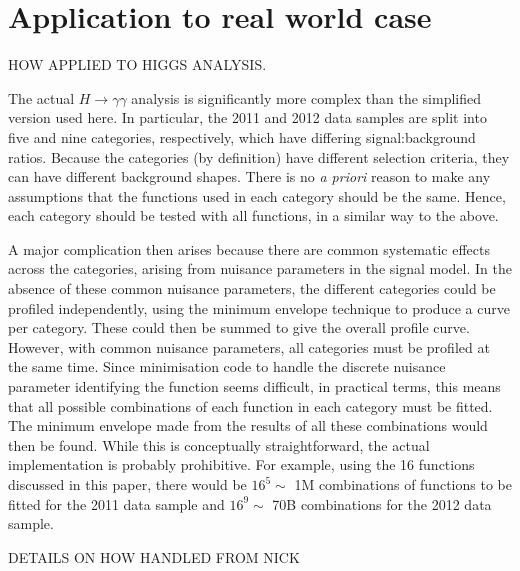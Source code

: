 
\section{Application to real world case}
\label{sec:discussion}
\label{sec:discussion:higgs}

HOW APPLIED TO HIGGS ANALYSIS.

The actual $H \rightarrow \gamma\gamma$ analysis is significantly more
complex than the simplified version used here. In particular, the 2011 
and 2012 data
samples are split into five and nine categories, respectively, which have
differing signal:background ratios.
Because the categories (by definition) have different selection criteria,
they can have different background shapes.
There is no {\it a priori} reason to make any assumptions that the functions
used in each category should be the same. Hence, each category should be
tested with all functions, in a similar way to the above.

A major complication then arises because there are common systematic effects
across the categories, arising from nuisance parameters in the signal
model.
In the absence of these common nuisance parameters,
the different categories could be profiled independently, using the
minimum envelope technique to produce a curve per category. These could then
be summed to give the overall profile curve. However, with common
nuisance parameters, all categories must be profiled at the same time.
Since minimisation code to handle the 
discrete nuisance parameter identifying the
function seems difficult, in practical terms, this means that all possible
combinations of each function in each category must be fitted.
The minimum envelope made from the results of all these combinations would
then be found. While this is conceptually straightforward, the actual
implementation is probably prohibitive. For example, using the 16 functions
discussed in this paper, there would be $16^5 \sim$ 1M combinations of functions
to be fitted for the 2011 data sample and $16^9 \sim$ 70B combinations for the
2012 data sample.

DETAILS ON HOW HANDLED FROM NICK






